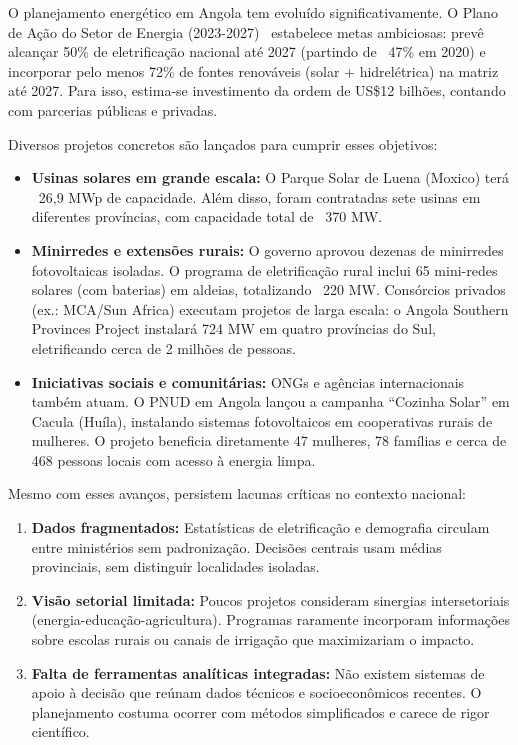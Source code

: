 \documentclass[12pt, a4paper]{article}
\begin{document}
\begin{itemize}
O planejamento energético em Angola tem evoluído significativamente. O Plano de Ação do Setor de Energia (2023-2027)~\citep{governo_angola_2022} estabelece metas ambiciosas: prevê alcançar 50\% de eletrificação nacional até 2027 (partindo de ~47\% em 2020) e incorporar pelo menos 72\% de fontes renováveis (solar + hidrelétrica) na matriz até 2027. Para isso, estima-se investimento da ordem de US\$12 bilhões, contando com parcerias públicas e privadas.

Diversos projetos concretos são lançados para cumprir esses objetivos:

\begin{itemize}
\item \textbf{Usinas solares em grande escala:} O Parque Solar de Luena (Moxico) terá ~26,9 MWp de capacidade. Além disso, foram contratadas sete usinas em diferentes províncias, com capacidade total de ~370 MW.
\item \textbf{Minirredes e extensões rurais:} O governo aprovou dezenas de minirredes fotovoltaicas isoladas. O programa de eletrificação rural inclui 65 mini-redes solares (com baterias) em aldeias, totalizando ~220 MW. Consórcios privados (ex.: MCA/Sun Africa) executam projetos de larga escala: o Angola Southern Provinces Project instalará 724 MW em quatro províncias do Sul, eletrificando cerca de 2 milhões de pessoas.
\item \textbf{Iniciativas sociais e comunitárias:} ONGs e agências internacionais também atuam. O PNUD em Angola lançou a campanha ``Cozinha Solar'' em Cacula (Huíla), instalando sistemas fotovoltaicos em cooperativas rurais de mulheres. O projeto beneficia diretamente 47 mulheres, 78 famílias e cerca de 468 pessoas locais com acesso à energia limpa.
\end{itemize}

Mesmo com esses avanços, persistem lacunas críticas no contexto nacional:

\begin{enumerate}
\item \textbf{Dados fragmentados:} Estatísticas de eletrificação e demografia circulam entre ministérios sem padronização. Decisões centrais usam médias provinciais, sem distinguir localidades isoladas.
\item \textbf{Visão setorial limitada:} Poucos projetos consideram sinergias intersetoriais (energia-educação-agricultura). Programas raramente incorporam informações sobre escolas rurais ou canais de irrigação que maximizariam o impacto.
\item \textbf{Falta de ferramentas analíticas integradas:} Não existem sistemas de apoio à decisão que reúnam dados técnicos e socioeconômicos recentes. O planejamento costuma ocorrer com métodos simplificados e carece de rigor científico.
\end{enumerate}


\end{itemize}
\end{document}
